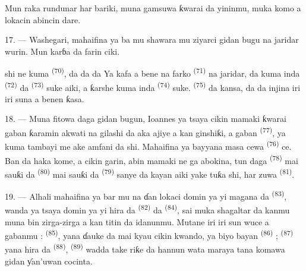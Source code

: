 Mun raka rundunar har bariki,  muna gamsuwa ƙwarai da
yininmu, muka komo a lokacin abincin dare.

\VUsaut{3.0mm}

17. --- Washegari, mahaifina ya ba mu shawara mu ziyarci gidan bugu na
jaridar wurin. Mun karɓa da farin ciki.

 shi ne kuma 
\textsuperscript{(70)}, da  da
 da  Ya kafa
a bene na farko  \textsuperscript{(71)} na jaridar,
da kuma  inda 
\textsuperscript{(72)} da 
\textsuperscript{(73)} suke aiki, a ƙarshe kuma  inda  \textsuperscript{(74)} suke.
 \textsuperscript{(75)} da kansa, da  da injina iri iri suna a benen ƙasa.

\VUsaut{3.0mm}

18. --- Muna fitowa daga gidan bugun, Ioannes ya tsaya cikin mamaki
ƙwarai gaban ƙaramin akwati na gilashi da aka ajiye a kan ginshiƙi, a
gaban  \textsuperscript{(77)}, ya kuma tambayi
me ake amfani da shi. Mahaifina ya bayyana masa cewa  \textsuperscript{(76)} ce. Ban da haka kome, a cikin
garin, abin mamaki ne ga abokina, tun daga 
\textsuperscript{(78)} mai sauƙi da 
\textsuperscript{(80)} mai sauƙi da 
\textsuperscript{(79)} sanye da kayan aiki yake tuƙa shi, har zuwa
 \textsuperscript{(81)}.

19. --- Alhali mahaifina ya bar mu na ɗan lokaci domin ya yi magana da
 \textsuperscript{(83)}, wanda ya tsaya domin ya
yi hira da  \textsuperscript{(82)} da 
\textsuperscript{(84)}, sai muka shagaltar da kanmu muna bin zirga-zirga a
kan titin da idanunmu. Mutane iri iri sun wuce a gabanmu :
 \textsuperscript{(85)}, yana ɗauke da
 mai kyau cikin kwando, ya biyo bayan  \textsuperscript{(86)} ; 
\textsuperscript{(87)} yana hira da 
\textsuperscript{(88)},  \textsuperscript{(89)} wadda
take riƙe da hannun wata maraya tana komawa gidan ƴan’uwan cocinta.

